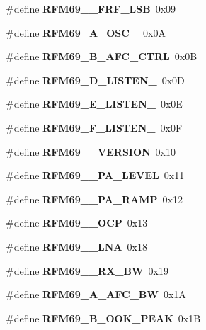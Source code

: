 \begin{DoxyCompactItemize}
\item 
\mbox{\label{_r_f_m69__registri_8h_a10c708dd05d4ee0f000bdf6415c7e31a}} 
\#define {\bfseries R\+F\+M69\+\_\+\_\+\+F\+R\+F\+\_\+\+L\+SB}~0x09
\item 
\mbox{\label{_r_f_m69__registri_8h_a7bcd33a6e8f13b7f2efdc01dbff25b21}} 
\#define {\bfseries R\+F\+M69\+\_\+A\+\_\+\+O\+S\+C\+\_}~0x0A
\item 
\mbox{\label{_r_f_m69__registri_8h_af0c648c6ee7c18280445ffad62980a4f}} 
\#define {\bfseries R\+F\+M69\+\_\+B\+\_\+\+A\+F\+C\+\_\+\+C\+T\+RL}~0x0B
\item 
\mbox{\label{_r_f_m69__registri_8h_a2f9cad662d4007b2e4ba5b8658d9b6f4}} 
\#define {\bfseries R\+F\+M69\+\_\+D\+\_\+\+L\+I\+S\+T\+E\+N\+\_}~0x0D
\item 
\mbox{\label{_r_f_m69__registri_8h_aabe42fe77d38ba304034cbbc1aecd4f7}} 
\#define {\bfseries R\+F\+M69\+\_\+E\+\_\+\+L\+I\+S\+T\+E\+N\+\_}~0x0E
\item 
\mbox{\label{_r_f_m69__registri_8h_a625c0d3534a658be413a401fd2707393}} 
\#define {\bfseries R\+F\+M69\+\_\+F\+\_\+\+L\+I\+S\+T\+E\+N\+\_}~0x0F
\item 
\mbox{\label{_r_f_m69__registri_8h_adfa02d15184bc76e70aebd8a8a0aefa9}} 
\#define {\bfseries R\+F\+M69\+\_\+\_\+\+V\+E\+R\+S\+I\+ON}~0x10
\item 
\mbox{\label{_r_f_m69__registri_8h_a18277b518a053a62adf370ac31696d9d}} 
\#define {\bfseries R\+F\+M69\+\_\+\_\+\+P\+A\+\_\+\+L\+E\+V\+EL}~0x11
\item 
\mbox{\label{_r_f_m69__registri_8h_a359be3fc7ed403ee04bf5e210a3c33d7}} 
\#define {\bfseries R\+F\+M69\+\_\+\_\+\+P\+A\+\_\+\+R\+A\+MP}~0x12
\item 
\mbox{\label{_r_f_m69__registri_8h_a4fa6043fbb3fb82b6417ba40bc9bcc34}} 
\#define {\bfseries R\+F\+M69\+\_\+\_\+\+O\+CP}~0x13
\item 
\mbox{\label{_r_f_m69__registri_8h_a211f841c70f60ec96901d05d6adcd303}} 
\#define {\bfseries R\+F\+M69\+\_\+\_\+\+L\+NA}~0x18
\item 
\mbox{\label{_r_f_m69__registri_8h_adf1c1ce55b1a8960c47d5aa7f87509a2}} 
\#define {\bfseries R\+F\+M69\+\_\+\_\+\+R\+X\+\_\+\+BW}~0x19
\item 
\mbox{\label{_r_f_m69__registri_8h_a0430e4c98f1674c40fca989c86ef1ac3}} 
\#define {\bfseries R\+F\+M69\+\_\+A\+\_\+\+A\+F\+C\+\_\+\+BW}~0x1A
\item 
\mbox{\label{_r_f_m69__registri_8h_ac58a20cfcbda739efee8c45eb8b982ca}} 
\#define {\bfseries R\+F\+M69\+\_\+B\+\_\+\+O\+O\+K\+\_\+\+P\+E\+AK}~0x1B

\end{DoxyCompactItemize}
